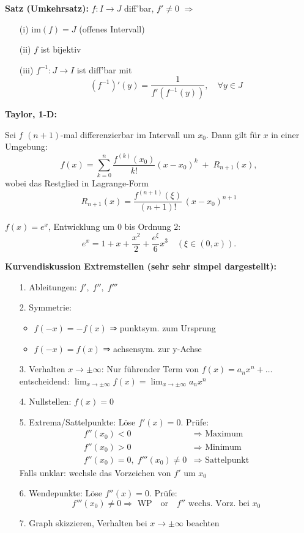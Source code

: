 \begin{itemize}
\textbf{Satz (Umkehrsatz):}  
\(f: I \to J\) diff'bar, \(f' \ne 0\)  
\(\Rightarrow\)
\begin{itemize}
  \item[(i)] \(\text{im}(f) = J\) (offenes Intervall)
  \item[(ii)] \(f\) ist bijektiv
  \item[(iii)] \(f^{-1}: J \to I\) ist diff'bar mit  
    \[
    (f^{-1})'(y) = \frac{1}{f'(f^{-1}(y))}, \quad \forall y \in J
    \]
\end{itemize}

\textbf{Taylor, 1-D:}
\begin{theorem}
  Sei $f$ $(n+1)$-mal differenzierbar im Intervall um $x_0$. Dann gilt für $x$ in einer Umgebung:
  \[
    f(x) = \sum_{k=0}^n \frac{f^{(k)}(x_0)}{k!}(x - x_0)^k 
    \;+\; R_{n+1}(x),
  \]
  wobei das Restglied in Lagrange-Form
  \[
    R_{n+1}(x) = \frac{f^{(n+1)}(\xi)}{(n+1)!}\,(x - x_0)^{n+1}
  \]
\end{theorem}
\begin{example}
  $f(x) = e^x$, Entwicklung um $0$ bis Ordnung $2$:
  \[
    e^x = 1 + x + \frac{x^2}{2} + \frac{e^\xi}{6} x^3 \quad(\xi\in(0,x)).
  \]
\end{example}

\textbf{Kurvendiskussion Extremstellen (sehr sehr simpel dargestellt):}
\begin{itemize}
  \item[1.] Ableitungen: \( f',\; f'',\; f''' \)
  \item[2.] Symmetrie:
    \begin{itemize}
      \item \( f(-x) = -f(x) \) ⇒ punktsym. zum Ursprung
      \item \( f(-x) = f(x) \) ⇒ achsensym. zur y-Achse
    \end{itemize}
  \item[3.] Verhalten \( x \to \pm\infty \):  
    Nur führender Term von \( f(x) = a_n x^n + \ldots \) entscheidend:  
    \( \lim_{x \to \pm\infty} f(x) = \lim_{x \to \pm\infty} a_n x^n \)
  \item[4.] Nullstellen: \( f(x) = 0 \)
  \item[5.] Extrema/Sattelpunkte: Löse \( f'(x) = 0 \). Prüfe:
    \[
    \begin{aligned}
      f''(x_0) < 0 &\Rightarrow \text{ Maximum} \\
      f''(x_0) > 0 &\Rightarrow \text{ Minimum} \\
      f''(x_0) = 0,\; f'''(x_0) \neq 0 &\Rightarrow \text{ Sattelpunkt}
    \end{aligned}
    \]
    Falls unklar: wechsle das Vorzeichen von \( f' \) um \( x_0 \)
  \item[6.] Wendepunkte: Löse \( f''(x) = 0 \). Prüfe:
    \[
    f'''(x_0) \neq 0 \Rightarrow \text{ WP}
    \quad \text{or} \quad
    f'' \text{ wechs. Vorz. bei } x_0
    \]
  \item[7.] Graph skizzieren, Verhalten bei \( x \to \pm\infty \) beachten
\end{itemize}



\end{itemize}
